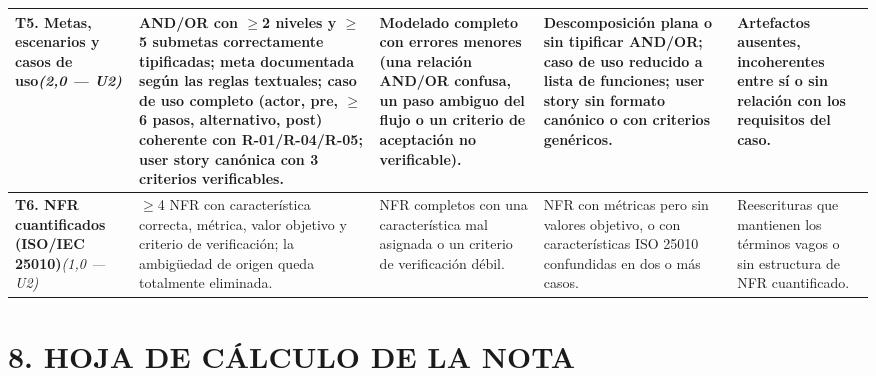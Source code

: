 \documentclass[11pt]{article}
\begin{document}
\begin{landscape}
{\begin{longtable}{|L{3.2cm}|L{5.6cm}|L{5.3cm}|L{4.9cm}|L{4.3cm}|}
\textbf{T5. Metas, escenarios y casos de uso}\newline\textit{(2{,}0 — U2)} &
AND/OR con $\geq$2 niveles y $\geq$5 submetas correctamente tipificadas; meta documentada según las reglas textuales; caso de uso completo (actor, pre, $\geq$6 pasos, alternativo, post) coherente con R-01/R-04/R-05; user story canónica con 3 criterios verificables. &
Modelado completo con errores menores (una relación AND/OR confusa, un paso ambiguo del flujo o un criterio de aceptación no verificable). &
Descomposición plana o sin tipificar AND/OR; caso de uso reducido a lista de funciones; user story sin formato canónico o con criterios genéricos. &
Artefactos ausentes, incoherentes entre sí o sin relación con los requisitos del caso. \\
\hline

\textbf{T6. NFR cuantificados (ISO/IEC 25010)}\newline\textit{(1{,}0 — U2)} &
$\geq$4 NFR con característica correcta, métrica, valor objetivo y criterio de verificación; la ambigüedad de origen queda totalmente eliminada. &
NFR completos con una característica mal asignada o un criterio de verificación débil. &
NFR con métricas pero sin valores objetivo, o con características ISO 25010 confundidas en dos o más casos. &
Reescrituras que mantienen los términos vagos o sin estructura de NFR cuantificado. \\
\hline

\end{longtable}
}
\end{landscape}

\section*{\textcolor{utegreendk}{8. HOJA DE CÁLCULO DE LA NOTA}}
\end{document}
